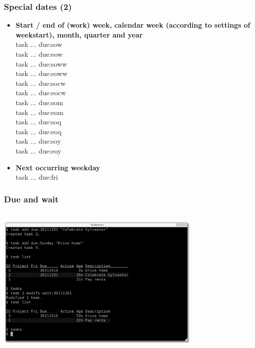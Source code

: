 \documentclass[t,handout]{beamer}
\begin{document}
\begin{frame}
\frametitle{Special dates (2)}
\begin{itemize}
\item \textbf{Start / end of (work) week, calendar week (according to settings of weekstart), month, quarter and year} \\
task ... due:sow \\
task ... due:eow \\
task ... due:soww \\
task ... due:eoww \\
task ... due:socw \\
task ... due:eocw \\
task ... due:som \\
task ... due:eom \\
task ... due:soq \\
task ... due:eoq \\
task ... due:soy \\
task ... due:eoy \\
\item \textbf{Next occurring weekday} \\
task ... due:fri
\end{itemize}
\end{frame}

\begin{frame}
\frametitle{Due and wait}
\begin{center}
\includegraphics[width=10cm,height=7.5cm]{due_and_wait.png}
\end{center}
\end{frame}
\end{document}
